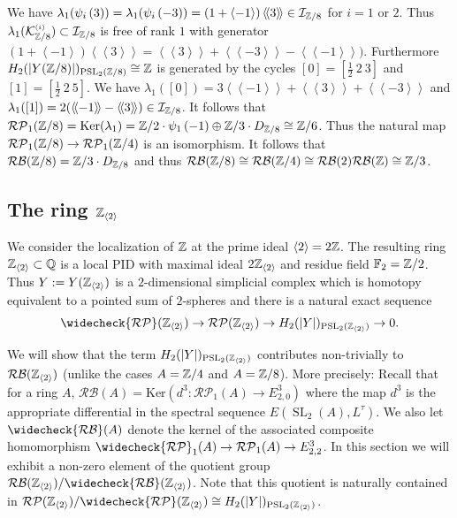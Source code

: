 \documentclass[12pt]{amsart}
\theoremstyle{definition}
\newcommand{\Q}{\Bbb{Q}}
\newcommand{\F}[1]{\Bbb{F}_{#1}}
\newcommand{\Z}{\Bbb{Z}}
\newcommand{\K}{\mathcal{K}}
\newcommand{\scyc}[1]{\left[ #1 \right]} %
\newcommand{\octt}[1]{\left[ #1\right]}%
\newcommand{\spl}[2]{\operatorname{SL}_{#1}\left(#2\right)}
\newcommand{\pspl}[2]{\mathrm{PSL}_{#1}(#2)}
\newcommand{\rpb}[1]{\mathcal{RP}(#1)}%
\newcommand{\rpbker}[1]{\mathcal{RP}_1(#1)}%
\newcommand{\crpbker}[1]{\widecheck{\mathcal{RP}}_1(#1)}
\newcommand{\crpb}[1]{\widecheck{\mathcal{RP}}(#1)}
\newcommand{\rbl}[1]{{\mathcal{RB}}(#1)}%
\newcommand{\crbl}[1]{\widecheck{\mathcal{RB}}(#1)}
\newcommand{\suss}[2]{\psi_{#1}\left( #2\right)}
\newcommand{\ks}[2]{{\K}^{\mbox{\tiny $(#1)$}}_{#2}}
\newcommand{\cconst}[1]{D_{#1}}
\newcommand{\<}{\langle}
\renewcommand{\>}{\rangle}
\renewcommand{\ker}[1]{\mathrm{Ker}(#1)}
\newcommand{\image}[1]{\mathrm{Im}(#1)}
\newcommand{\an}[1]{\left\langle{#1}\right\rangle}
\newcommand{\pf}[1]{\left\langle\!\left\langle{#1}\right\rangle\!\right\rangle}
\newcommand{\aug}[1]{\mathcal{I}_{#1}}
\begin{document}
We have $\lambda_1(\suss{i}{3})=\lambda_1(\suss{i}{-3})=(1+\an{-1})\pf{3}\in\aug{\Z/8}$ for $i=1$ or $2$. Thus $\lambda_1(\ks{i}{\Z/8})\subset\aug{\Z/8}$ is free of rank $1$ with generator $(1+\an{-1})\pf{3}=\pf{3}+\pf{-3}-\pf{-1})$. 
Furthermore $H_2(|Y(\Z/8)|)_{\pspl{2}{\Z/8}}\cong\Z$ is generated by the cycles $\octt{0}=\scyc{\frac{1}{2}\ 2\ 3}$ and 
$\octt{1}=\scyc{\frac{1}{2}\ 2\ 5}$. We have  $\lambda_1(\octt{0})=3\pf{-1}+\pf{3}+\pf{-3}$ and $\lambda_1(\octt{1})=2(\pf{-1}-\pf{3})\in\aug{\Z/8}$. It follows that $\rpbker{\Z/8}=\ker{\lambda_1}=\Z/2\cdot\suss{1}{-1}\oplus \Z/3\cdot\cconst{\Z/8}\cong \Z/6$. Thus the natural map $\rpbker{\Z/8}\to\rpbker{\Z/4}$ is an isomorphism. It  follows that $\rbl{\Z/8}=\Z/3\cdot\cconst{\Z/8}$ and thus $\rbl{\Z/8}\cong\rbl{\Z/4}\cong\rbl{\/2}\rbl{\Z}\cong \Z/3$.
\subsection{The ring $\Z_{\an{2}}$}
  We consider the localization of $\Z$ at the prime ideal $\an{2}=2\Z$. The resulting ring $\Z_{\an{2}}\subset \Q$ is a local PID with maximal ideal 
$2\Z_{\an{2}}$ and residue field $\F{2}=\Z/2$. Thus $Y:=Y(\Z_{\an{2}})$ is a $2$-dimensional simplicial complex which is homotopy equivalent to a pointed sum of $2$-spheres and there is a natural exact sequence
\[
\crpb{\Z_{\an{2}}}\to\rpb{\Z_{\an{2}}}\to H_2(|Y|)_{\pspl{2}{\Z_{\an{2}}}}\to 0.
\]

We will show that the term $ H_2(|Y|)_{\pspl{2}{\Z_{\an{2}}}}$ contributes non-trivially to $\rbl{\Z_{\an{2}}}$ (unlike the cases $A=\Z/4$ and $A=\Z/8$). More precisely:   Recall that for a ring $A$, $\rbl{A}=\ker{d^3:\rpbker{A}\to E^3_{2,0}}$ where the map $d^3$ is the appropriate differential in the spectral sequence $E(\spl{2}{A}, L^\tau)$.  We also let $\crbl{A}$ denote the kernel of the associated composite homomorphism $\crpbker{A}\to \rpbker{A}\to E^3_{2,2}$.
  In this section we will exhibit a non-zero element of the quotient group $\rbl{\Z_{\an{2}}}/\crbl{\Z_{\an{2}}}$. Note that this quotient  is naturally contained in $\rpb{\Z_{\an{2}}}/\crpb{\Z_{\an{2}}}\cong H_2(|Y|)_{\pspl{2}{\Z_{\an{2}}}}$.
\end{document}
